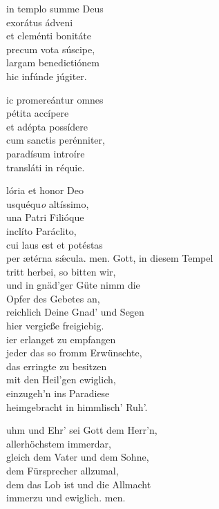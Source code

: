\documentclass[fontsize=10pt,paper=A5,twoside,BCOR=1mm,DIV=21,headinclude]{scrarticle}
\begin{document}
\begin{paracol}{2}\pcb
\begin{hymnus}
 in templo summe Deus\\
\hspace{1.6em} exorátus ádveni\\
et cleménti bonitáte\\
precum vota súscipe,\\
largam benedictiónem\\
hic infúnde júgiter.

ic promereántur omnes\\
pétita accípere \\
et adépta possídere\\
cum sanctis perénniter,\\
paradísum introíre\\
transláti in réquie.

lória et honor Deo\\
usquéqu\textit{o} altíssimo,\\
una Patri Filióque\\
inclíto Paráclito,\\
cui laus est et potéstas\\
per ætérna s\'æcula.
men.
	\switchcolumn 
	 Gott, in diesem Tempel\\
	\hspace{1.6em} tritt herbei, so bitten wir,\\
	und in gnäd'ger Güte nimm die \\
	Opfer des Gebetes an,\\
	reichlich Deine Gnad' und Segen \\
	hier vergieße freigiebig.\\

	ier erlanget zu empfangen\\
	jeder das so fromm Erwünschte,\\
	das erringte zu besitzen\\
	mit den Heil'gen ewiglich,\\
	einzugeh'n ins Paradiese\\
	heimgebracht in himmlisch' Ruh'.

	uhm und Ehr' sei Gott dem Herr'n,\\
	allerhöchstem immerdar,\\
	gleich dem Vater und dem Sohne,\\
	dem Fürsprecher allzumal,\\
	dem das Lob ist und die Allmacht\\
	immerzu und ewiglich. men.

\end{hymnus}
\end{paracol}

\end{document}
